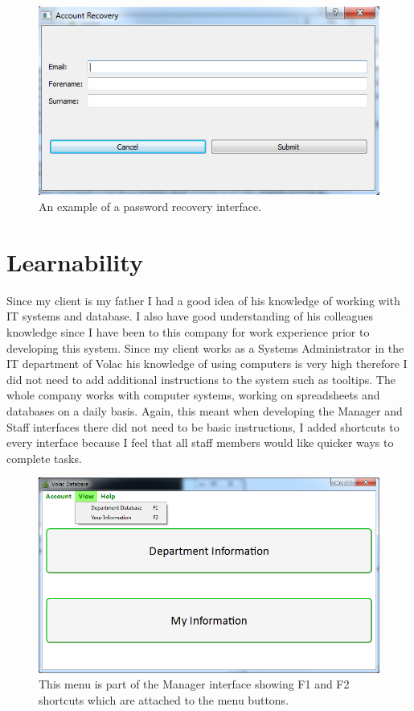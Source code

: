 \begin{figure}[H]
    \includegraphics[width=\textwidth]{./Testing/Images/ForgotPassword.png}
    \caption{An example of a password recovery interface.} 
\end{figure}


\section{Learnability}

Since my client is my father I had a good idea of his knowledge of working with IT systems and database. I also have good understanding of his colleagues knowledge since I have been to this company for work experience prior to developing this system. Since my client works as a Systems Administrator in the IT department of Volac his knowledge of using computers is very high therefore I did not need to add additional instructions to the system such as tooltips. The whole company works with computer systems, working on spreadsheets and databases on a daily basis. Again, this meant when developing the Manager and Staff interfaces there did not need to be basic instructions, I added shortcuts to every interface because I feel that all staff members would like quicker ways to complete tasks.

\begin{figure}[H]
    \includegraphics[width=\textwidth]{./Evaluation/Images/shortcuts2.png}
    \caption{This menu is part of the Manager interface showing F1 and F2 shortcuts which are attached to the menu buttons.} 
\end{figure}


